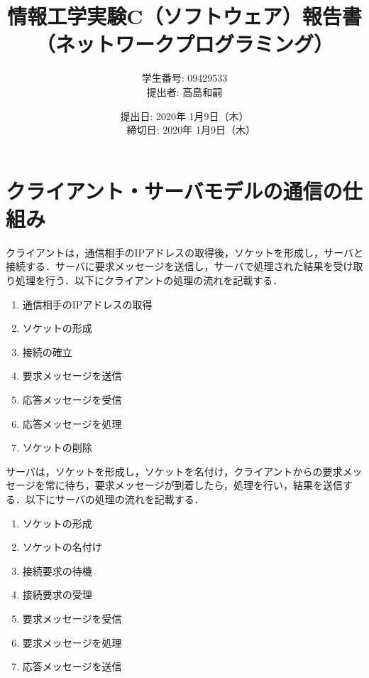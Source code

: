 \documentclass{jarticle}[11pt]
\title{{\normalsize 情報工学実験C（ソフトウェア）報告書}\\
    （ネットワークプログラミング）\\
    }
\author{ 
      学生番号: 09429533 \\
      提出者: 高島和嗣
    }
\date{
      提出日: 2020年 1月9日（木） \\　%
      締切日: 2020年 1月9日（木）
    }
\begin{document}
    \maketitle
    \section{クライアント・サーバモデルの通信の仕組み}
    クライアントは，通信相手のIPアドレスの取得後，ソケットを形成し，サーバと接続する．サーバに要求メッセージを送信し，サーバで処理された結果を受け取り処理を行う．以下にクライアントの処理の流れを記載する．
    \begin{enumerate}
    \item 通信相手のIPアドレスの取得 
    \item ソケットの形成
    \item 接続の確立
    \item 要求メッセージを送信
    \item 応答メッセージを受信
    \item 応答メッセージを処理
    \item ソケットの削除
    \end{enumerate}
    サーバは，ソケットを形成し，ソケットを名付け，クライアントからの要求メッセージを常に待ち，要求メッセージが到着したら，処理を行い，結果を送信する．以下にサーバの処理の流れを記載する．
    \begin{enumerate}
    \item ソケットの形成
    \item ソケットの名付け
    \item 接続要求の待機
    \item 接続要求の受理
    \item 要求メッセージを受信
    \item 要求メッセージを処理
    \item 応答メッセージを送信
    \end{enumerate}

\end{document}
